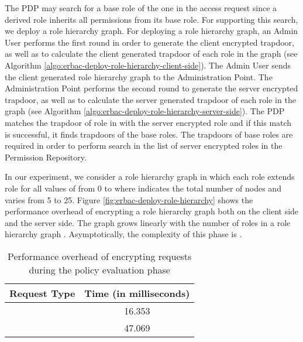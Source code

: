 \documentclass[epsfig,a4paper,11pt,titlepage]{book}
\numberwithin{algorithm}{chapter}
\begin{document}
The \gls{PDP} may search for a base role of the one in the access request  since a derived role inherits all permissions from its base role. For supporting this search, we deploy a role hierarchy graph. For deploying a role hierarchy graph, an Admin User performs the first round in order to generate the client encrypted trapdoor, as well as to calculate the client generated trapdoor of each role in the graph (see Algorithm \ref{algo:erbac-deploy-role-hierarchy-client-side}). The Admin User sends the client generated role hierarchy graph to the Administration Point. The Administration Point performs the second round to generate the server encrypted trapdoor, as well as to calculate the server generated trapdoor of each role in the graph (see Algorithm \ref{algo:erbac-deploy-role-hierarchy-server-side}). The \gls{PDP} matches the trapdoor of role in  with the server encrypted role and if this match is successful, it finds trapdoors of the base roles. The trapdoors of base roles are required in order to perform search in the list of server encrypted roles in the Permission Repository.

In our experiment, we consider a role hierarchy graph in which each role  extends role  for all values of  from 0 to  where  indicates the total number of nodes and varies from 5 to 25. Figure \ref{fig:erbac-deploy-role-hierarchy} shows the performance overhead of encrypting a role hierarchy graph both on the client side and the server side. The graph grows linearly with the number of roles in a role hierarchy graph . Asymptotically, the complexity of this phase is .


\begin{table} [htp]
\centering
\caption[Performance overhead of encrypting requests]{Performance overhead of encrypting requests during the policy evaluation phase}
\label{tab:erbac-request}
\begin{tabular}{ |l|c| }
\hline
\textbf{Request Type} & \textbf{Time (in milliseconds)} \\ \hline
 & 16.353 \\ \hline
 & 47.069 \\ \hline
\end{tabular}
\end{table}
\end{document}

